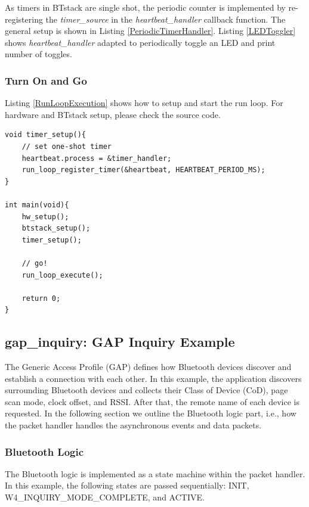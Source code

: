 \documentclass[a4paper,titlepage,oneside,12pt]{amsart} %
\begin{document}
As timers in BTstack are single shot, the periodic counter is implemented by re-registering the \emph{timer\_source} in the \emph{heartbeat\_handler} callback function. The general setup is shown in Listing \ref{PeriodicTimerHandler}. Listing \ref{LEDToggler} shows \emph{heartbeat\_handler} adapted to periodically toggle an LED and print number of toggles.


\subsubsection{Turn On and Go}

Listing \ref{RunLoopExecution} shows how to setup and start the run loop. For hardware and BTstack setup, please check the source code. 

\begin{lstlisting}[float, caption= Run loop execution., label=RunLoopExecution]
void timer_setup(){
    // set one-shot timer
    heartbeat.process = &timer_handler;
    run_loop_register_timer(&heartbeat, HEARTBEAT_PERIOD_MS);
}

int main(void){
    hw_setup();
    btstack_setup();
    timer_setup();
    
    // go!
    run_loop_execute(); 
    
    return 0;
}
\end{lstlisting}

    
\subsection{gap\_inquiry: GAP Inquiry Example}
\label{example:GapInquiry}

The Generic Access Profile (GAP) defines how Bluetooth devices discover and establish a connection with each other. In this example, the application discovers  surrounding Bluetooth devices and collects their Class of Device (CoD), page scan mode, clock offset, and RSSI. After that, the remote name of each device is requested. In the following section we outline the Bluetooth logic part, i.e., how the packet handler handles the asynchronous events and data packets.

\subsubsection{Bluetooth Logic}
The Bluetooth logic is implemented as a state machine within the packet handler. In this example, the following states are passed sequentially: INIT, W4\_INQUIRY\_MODE\_COMPLETE, and ACTIVE. 
\end{document}
